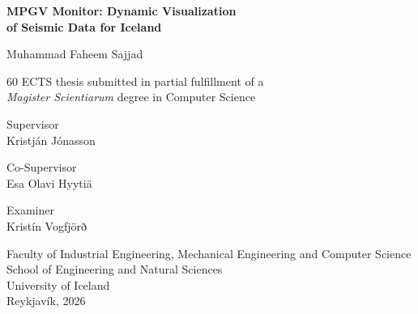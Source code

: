 \documentclass[12pt]{article}
\begin{document}
\begin{titlepage}
    \thispagestyle{empty}
    \begin{center}

        {\Large\rmfamily\bfseries MPGV Monitor: Dynamic Visualization\\
        of Seismic Data for Iceland\par}


        {\rmfamily Muhammad Faheem Sajjad\par}


        {\normalsize 60 ECTS thesis submitted in partial fulfillment of a\\
        \textit{Magister Scientiarum} degree in Computer Science\par}

        {\large\rmfamily Supervisor\\}
        Kristján Jónasson\par

        {\large\rmfamily Co-Supervisor\\}
        Esa Olavi Hyytiä\par

        {\large\rmfamily Examiner\\}
        Kristín Vogfjörð\par
        

        Faculty of Industrial Engineering, Mechanical Engineering and Computer Science\\
        School of Engineering and Natural Sciences\\
        University of Iceland\\
        Reykjavík, 2026

    \end{center}
\end{titlepage}
\end{document}
